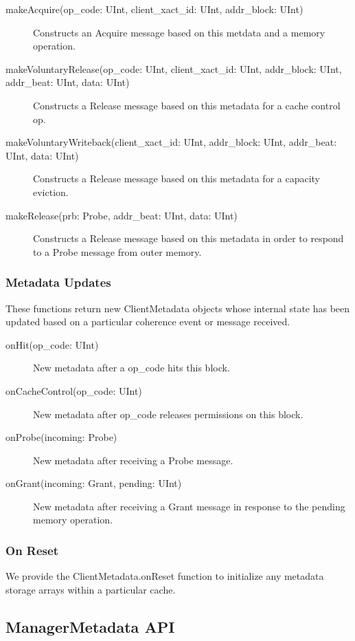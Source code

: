 \begin{description}
\item[makeAcquire(op\_code: UInt, client\_xact\_id: UInt, addr\_block: UInt) ]
Constructs an Acquire message based on this metdata and a memory operation.
\item[makeVoluntaryRelease(op\_code: UInt, client\_xact\_id: UInt, addr\_block: UInt, addr\_beat: UInt, data: UInt) ]
Constructs a Release message based on this metadata for a cache control op.
\item[makeVoluntaryWriteback(client\_xact\_id: UInt, addr\_block: UInt, addr\_beat: UInt, data: UInt) ]
Constructs a Release message based on this metadata for a capacity eviction.
\item[makeRelease(prb: Probe, addr\_beat: UInt, data: UInt) ]
Constructs a Release message based on this metadata in order to respond to a Probe message from outer memory.
\end{description}

\subsubsection{Metadata Updates}

These functions return new ClientMetadata objects whose internal state has been updated based on a particular coherence event or message received.

\begin{description}
\item[onHit(op\_code: UInt) ]
New metadata after a op\_code hits this block.
\item[onCacheControl(op\_code: UInt) ]
New metadata after op\_code releases permissions on this block.
\item[onProbe(incoming: Probe) ]
New metadata after receiving a Probe message.
\item[onGrant(incoming: Grant, pending: UInt) ]
New metadata after receiving a Grant message in response to the pending memory operation.
\end{description}

\subsubsection{On Reset}

We provide the ClientMetadata.onReset function to initialize any metadata storage arrays within a particular cache.

\subsection{ManagerMetadata API} 


